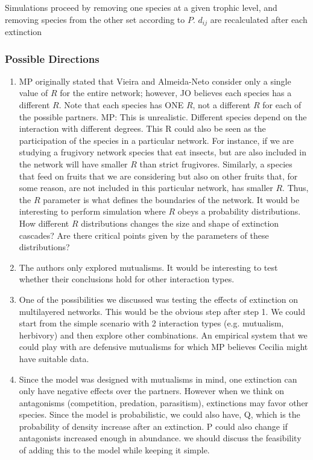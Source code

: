 \documentclass[12pt]{article}
\begin{document}
Simulations proceed by removing one species at a given trophic level, and removing species from the other set according to $P$. $d_{ij}$ are recalculated after each extinction


\subsubsection*{Possible Directions}

\begin{enumerate}

	\item MP originally stated that Vieira and Almeida-Neto consider only a single value of $R$ for the entire network; however, JO believes each species has a different $R$. Note that each species has ONE $R$, not a different $R$ for each of the possible partners. MP: This is unrealistic. Different species depend on the interaction with different degrees. This R could also be seen as the participation of the species in a particular network. For instance, if we are studying a frugivory network species that eat insects, but are also included in the network will have smaller $R$ than strict frugivores. Similarly, a species that feed on fruits that we are considering but also on other fruits that, for some reason, are not included in this particular network, has smaller $R$.  Thus, the $R$ parameter is what defines the boundaries of the network. It would be interesting to perform simulation where $R$ obeys a probability distributions. How different $R$ distributions changes the size and shape of extinction cascades? Are there critical points given by the parameters of these distributions?

	\item The authors only explored mutualisms. It would be interesting to test whether their conclusions hold for other interaction types.

	\item One of the possibilities we discussed was testing the effects of extinction on multilayered networks. This would be the obvious step after step 1. We could start from the simple scenario with 2 interaction types (e.g. mutualism, herbivory) and then explore other combinations. An empirical system that we could play with are defensive mutualisms for which MP believes Cecilia might have suitable data.

	\item Since the model was designed with mutualisms in mind, one extinction can only have negative effects over the partners. However when we think on antagonisms (competition, predation, parasitism), extinctions may favor other species. Since the model is probabilistic, we could also have, Q, which is the probability of density increase after an extinction. P could also change if antagonists increased enough in abundance. we should discuss the feasibility of adding this to the model while keeping it simple.

\end{enumerate}
\end{document}

